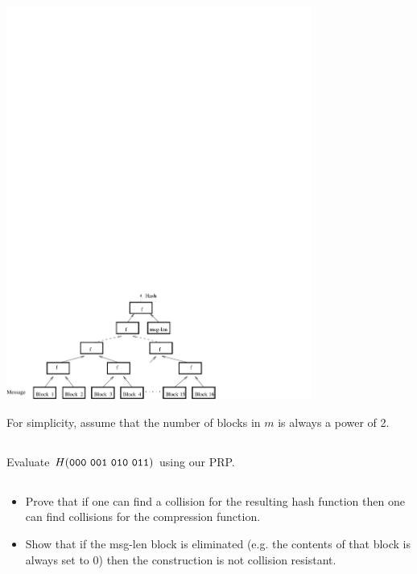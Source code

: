 \documentclass[12pt]{article}
\let\sol=\undefined
\newcommand{\sol}[1]{\begin{proof}\color{red}\textbf[SOLUTION: {#1}]\end{proof}}
\begin{document}
\begin{center}
\includegraphics[width=10cm]{img/hash-tree.pdf}
\end{center}

For simplicity, assume that the number of blocks in $m$ is always a power of 2.

\subsection{}

Evaluate $H({\tt 000~001~010~011})$ using our PRP.


\sol{
${\tt 000}$
}

\subsection{}

\begin{itemize}
\item Prove that if one can find a collision for the resulting hash function then one can
find collisions for the compression function.
\item Show that if the msg-len block is eliminated (e.g. the contents of that block is always set to 0) then the construction is not collision resistant.
\end{itemize}
\end{document}
